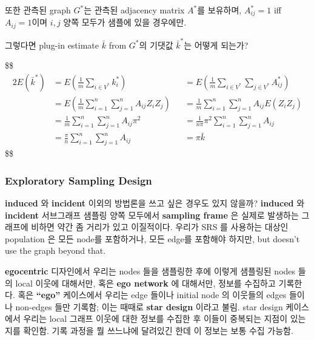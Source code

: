 \documentclass[
]{book}
\begin{document}
{{{또한 관측된 graph \(G^\ast\)는 관측된 adjacency matrix \(A^\ast\)를 보유하며, \(A_{ij}^\ast =1\) iff \(A_{ij}=1\)이며 \(i,j\) 양쪽 모두가 샘플에 있을 경우에만.

그렇다면 plug-in estimate \(\bar k\) from \(G^\ast\)의 기댓값 \(\bar k^\ast\)는 어떻게 되는가?

\$\$
\begin{alignat}{2}

E \left( \bar k^\ast \right)


&= E \left( \frac{1}{m} \sum_{i \in V^\ast} k_i^\ast \right)

&&= E \left( \frac{1}{m} \sum_{i \in V^\ast} \sum_{j \in V^\ast} A_{ij}^\ast \right)

\\


&= E \left( \frac{1}{m} \sum_{i=1}^n \sum_{j =1}^n A_{ij}Z_i Z_j \right)

&&= \frac{1}{m} \sum_{i=1}^n \sum_{j =1}^n A_{ij}  E \left(Z_i Z_j \right)

\\

&= \frac{1}{m} \sum_{i=1}^n \sum_{j =1}^n A_{ij}  \pi^2

&&=\frac{1}{n \pi} \pi^2 \sum_{i=1}^n \sum_{j =1}^n A_{ij}  

\\

&= \frac{\pi}{n } \sum_{i=1}^n \sum_{j =1}^n A_{ij}  

&&= \pi \bar k




\end{alignat}
\$\$

\hypertarget{exploratory-sampling-design}{%
\subsubsection{Exploratory Sampling Design}\label{exploratory-sampling-design}}

\textbf{induced} 와 \textbf{incident} 이외의 방법론을 쓰고 싶은 경우도 있지 않을까? \textbf{induced} 와 \textbf{incident} 서브그래프 샘플링 양쪽 모두에서 \textbf{sampling frame} 은 실제로 발생하는 그래프에 비하면 약간 좀 거리가 있고 이질적이다. 우리가 SRS 를 사용하는 대상인 population 은 모든 node를 포함하거나, 모든 edge를 포함해야 하지만, but doesn't use the graph beyond that.

\textbf{egocentric} 디자인에서 우리는 nodes 들을 샘플링한 후에 이렇게 샘플링된 nodes 들의 local 이웃에 대해서만, 혹은 \textbf{ego network} 에 대해서만, 정보를 수집하고 기록한다. 혹은 \textbf{``ego''} 케이스에서 우리는 edge 들이나 initial node 의 이웃들의 edges 들이나 non-edges 들만 기록함; 이는 때때로 \textbf{star design} 이라고 불림. star design 케이스에서 우리는 local 그래프 이웃에 대한 정보를 수집한 후 이들이 중복되는 지점이 있는지를 확인함. 기록 과정을 뭘 쓰느냐에 달려있긴 한데 이 정보는 보통 수집 가능함.

}}}
\end{document}
